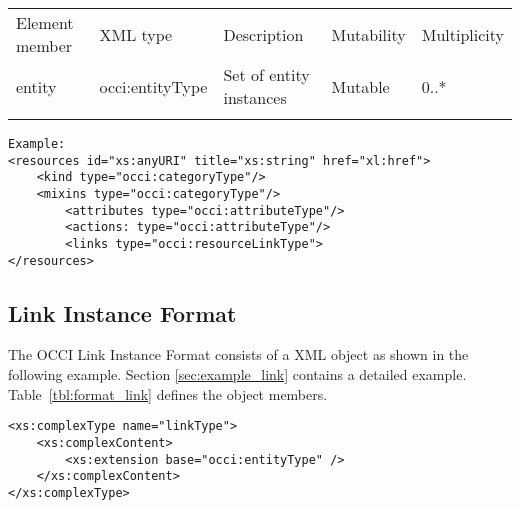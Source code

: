 \documentclass[10pt,a4paper]{article}
\begin{document}
 {
    \begin{tabularx}{\textwidth}{llXll}
    \toprule
    Element member & XML type & Description & Mutability & Multiplicity \\
    \colrule
    entity & occi:entityType & Set of entity instances & Mutable & 0..* \\
    \botrule
    \end{tabularx}
}
\FloatBarrier

\begin{lstlisting}
Example:
<resources id="xs:anyURI" title="xs:string" href="xl:href">
	<kind type="occi:categoryType"/>
	<mixins type="occi:categoryType"/>
        <attributes type="occi:attributeType"/>
        <actions: type="occi:attributeType"/>
        <links type="occi:resourceLinkType"> 
</resources>
\end{lstlisting}

\subsection{Link Instance Format}
\label{sec:format_link}

The OCCI Link Instance Format consists of a XML object as shown in the
following example. Section \ref{sec:example_link} contains a detailed example.
Table~\ref{tbl:format_link} defines the object members.

\begin{lstlisting}
<xs:complexType name="linkType">
	<xs:complexContent>
		<xs:extension base="occi:entityType" />
	</xs:complexContent>
</xs:complexType>
\end{lstlisting}
\end{document}
